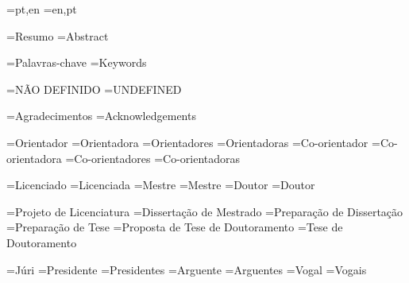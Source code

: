 \UNL@abstractorder[pt]={pt,en}
\UNL@abstractorder[en]={en,pt}



\UNL@abstractname[pt]={Resumo}
\UNL@abstractname[en]={Abstract}

\UNL@keywordsname[pt]={Palavras-chave}
\UNL@keywordsname[en]={Keywords}

\UNL@notdefined[pt]={NÃO DEFINIDO}
\UNL@notdefined[en]={UNDEFINED}

\UNL@acknowledgementsname[pt]={Agradecimentos}
\UNL@acknowledgementsname[en]={Acknowledgements}


\UNL@adviserstr[1,m,pt]={Orientador}
\UNL@adviserstr[1,f,pt]={Orientadora}
\UNL@adviserstr[2,m,pt]={Orientadores}
\UNL@adviserstr[2,f,pt]={Orientadoras}
\UNL@coadviserstr[1,m,pt]={Co-orientador}
\UNL@coadviserstr[1,f,pt]={Co-orientadora}
\UNL@coadviserstr[2,m,pt]={Co-orientadores}
\UNL@coadviserstr[2,f,pt]={Co-orientadoras}

\UNL@degreestr[bsc,m,pt]={Licenciado}
\UNL@degreestr[bsc,f,pt]={Licenciada}
\UNL@degreestr[msc,m,pt]={Mestre}
\UNL@degreestr[msc,f,pt]={Mestre}
\UNL@degreestr[phd,m,pt]={Doutor}
\UNL@degreestr[phd,f,pt]={Doutor}

\UNL@doctypestr[bsc,pt]={Projeto de Licenciatura}
\UNL@doctypestr[msc,pt]={Dissertação de Mestrado}
\UNL@doctypestr[prepmsc,pt]={Preparação de Dissertação}
\UNL@doctypestr[prepphd,pt]={Preparação de Tese}
\UNL@doctypestr[phd,pt]={Proposta de Tese de Doutoramento}
\UNL@doctypestr[propphd,pt]={Tese de Doutoramento}

\UNL@jurytitlestr[pt]={Júri}
\UNL@presidentstr[1,pt]={Presidente}
\UNL@presidentstr[2,pt]={Presidentes}
\UNL@refereestr[1,pt]={Arguente}
\UNL@refereestr[2,pt]={Arguentes}
\UNL@memberstr[1,pt]={Vogal}
\UNL@memberstr[2,pt]={Vogais}

